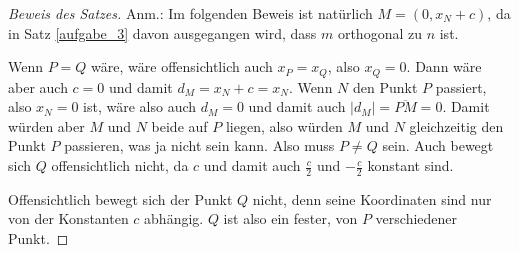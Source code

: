 \begin{proof}[Beweis des Satzes]
    \renewcommand{\qedsymbol}{$\square$}
    Anm.: Im folgenden Beweis ist natürlich $M=(0, x_N+c)$, da in Satz \ref{aufgabe_3} davon ausgegangen wird, dass 
    $m$ orthogonal zu $n$ ist.

    Wenn $P=Q$ wäre, wäre offensichtlich auch $x_P=x_Q$, also $x_Q=0$. Dann wäre aber auch $c=0$ und damit $d_M
    =x_N+c=x_N$. Wenn $N$ den Punkt $P$ passiert, also $x_N=0$ ist, wäre also auch $d_M=0$ und damit auch $|d_M|
    =\overline{PM}=0$. Damit  würden aber $M$ und $N$ beide auf $P$ liegen, also würden $M$ und $N$ gleichzeitig 
    den Punkt $P$ passieren, was ja nicht sein kann. Also muss $P\neq Q$ sein. Auch bewegt sich $Q$ offensichtlich 
    nicht, da $c$ und damit auch $\frac{c}{2}$ und $-\frac{c}{2}$ konstant sind.

    Offensichtlich bewegt sich der Punkt $Q$ nicht, denn seine Koordinaten sind nur von der Konstanten $c$ abhängig. 
    $Q$ ist also ein fester, von $P$ verschiedener Punkt.
    

\end{proof}
